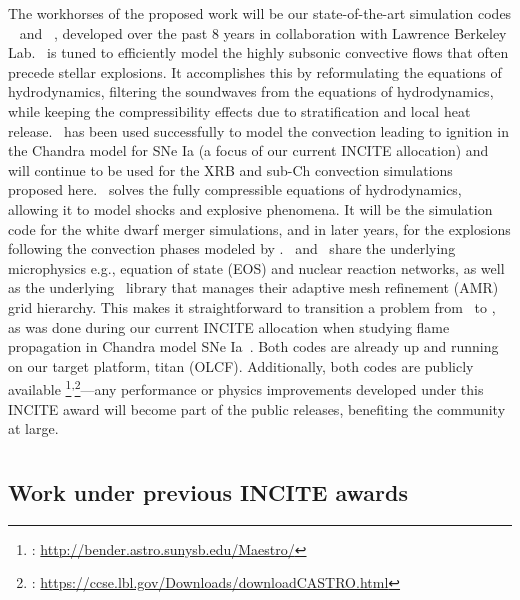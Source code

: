 \documentclass[11pt,letterpaper,english]{article}
\newcommand\fnsep{\textsuperscript{,}}
\begin{document}
The workhorses of the proposed work will be our state-of-the-art
simulation codes \maestro~\cite{multilevel} and
\castro~\cite{castro:I}, developed over the past 8 years in
collaboration with Lawrence Berkeley Lab.  \maestro\ is tuned to
efficiently model the highly subsonic convective flows that often
precede stellar explosions.  It accomplishes this by reformulating
the equations of hydrodynamics, filtering the
soundwaves from the equations of hydrodynamics, while keeping 
the compressibility effects due to stratification and local heat release.
\maestro\ has been used successfully to model the convection leading
to ignition in the Chandra model for SNe Ia (a focus of our current
INCITE allocation) and will continue to be used for the XRB and sub-Ch
convection simulations proposed here.  \castro\ solves the fully
compressible equations of hydrodynamics, allowing it to model shocks
and explosive phenomena.  It will be the simulation code for the white
dwarf merger simulations, and in later years, for the explosions
following the convection phases modeled by \maestro.  \maestro\ and
\castro\ share the underlying microphysics e.g., equation of state
(EOS) and nuclear reaction networks, as well as the underlying
\boxlib\ library that manages their adaptive mesh refinement (AMR)
grid hierarchy.  This makes it straightforward to transition a problem
from \maestro\ to \castro, as was done during our current INCITE
allocation when studying flame propagation in Chandra model SNe
Ia~\cite{Mal14}.  Both codes are already up and running on our target
platform, titan (OLCF).  Additionally, both codes are publicly
available%
\footnote{\maestro: \url{http://bender.astro.sunysb.edu/Maestro/}}\fnsep\footnote{\castro: \url{https://ccse.lbl.gov/Downloads/downloadCASTRO.html}}---any
performance or physics improvements developed under this INCITE award
will become part of the public releases, benefiting the community
at large.

\section{\flash}

\section{\chimera}


\subsection{Work under previous INCITE awards}
\end{document}
